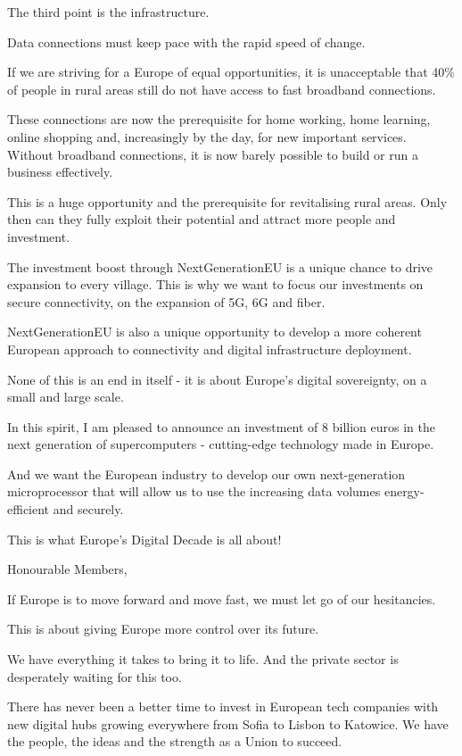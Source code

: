 \documentclass[a4paper,11pt]{article}
\begin{document}
The third point is the infrastructure.

Data connections must keep pace with the rapid speed of change.

If we are striving for a Europe of equal opportunities, it is unacceptable that 40\% of people in rural areas still do not have access to fast broadband connections.

These connections are now the prerequisite for home working, home learning, online shopping and, increasingly by the day, for new important services.  Without broadband connections, it is now barely possible to build or run a business effectively.

This is a huge opportunity and the prerequisite for revitalising rural areas. Only then can they fully exploit their potential and attract more people and investment.

The investment boost through NextGenerationEU is a unique chance to drive expansion to every village. This is why we want to focus our investments on secure connectivity, on the expansion of 5G, 6G and fiber.

NextGenerationEU is also a unique opportunity to develop a more coherent European approach to connectivity and digital infrastructure deployment.

None of this is an end in itself - it is about Europe's digital sovereignty, on a small and large scale.

In this spirit, I am pleased to announce an investment of 8 billion euros in the next generation of supercomputers - cutting-edge technology made in Europe.

And we want the European industry to develop our own next-generation microprocessor that will allow us to use the increasing data volumes energy-efficient and securely.

This is what Europe's Digital Decade is all about!

 

Honourable Members,

If Europe is to move forward and move fast, we must let go of our hesitancies.

This is about giving Europe more control over its future.

We have everything it takes to bring it to life. And the private sector is desperately waiting for this too.

There has never been a better time to invest in European tech companies with new digital hubs growing everywhere from Sofia to Lisbon to Katowice.  We have the people, the ideas and the strength as a Union to succeed.
\end{document}
